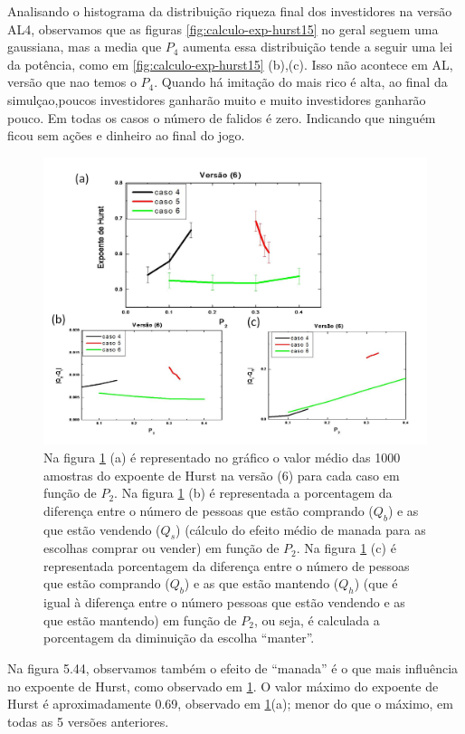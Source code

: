 \documentclass[brazil,ruledheader]{abnt}
\begin{document}
Analisando o histograma da distribuição riqueza final dos investidores na versão
AL4, observamos que as figuras \ref{fig:calculo-exp-hurst15} no geral 
seguem uma gaussiana, mas a media que $P_4$ aumenta essa distribuição tende a
seguir uma lei da potência, como em \ref{fig:calculo-exp-hurst15} (b),(c).
Isso não acontece em AL, versão que nao temos o $P_4$. Quando há imitação do
mais rico é alta, ao final da simulçao,poucos investidores ganharão muito e
muito investidores ganharão pouco. Em todas os casos o número de falidos é zero.
Indicando que ninguém ficou sem ações e dinheiro ao final do jogo.

\begin{figure}[!h]
\centering
\includegraphics[width=.7\linewidth]{Figuras/44.jpg}
\caption{Na figura \ref{fig:grafico6} (a) é representado no gráfico o valor
médio das 1000 amostras do expoente de Hurst na versão (6) para cada caso em
função de $P_2$. Na figura \ref{fig:grafico6} (b) é representada a porcentagem
 da diferença entre o número de pessoas que estão
comprando ($Q_b$) e as que estão vendendo ($Q_s$) (cálculo do efeito médio de
manada para as escolhas comprar ou vender) em função de $P_2$. Na figura
\ref{fig:grafico6} (c) é representada porcentagem  da
diferença entre o número de pessoas que estão comprando ($Q_b$) e as que estão
mantendo ($Q_h$) (que é igual à diferença entre o número pessoas que estão
vendendo e as que estão mantendo) em função de $P_2$, ou seja, é calculada a
porcentagem da diminuição da escolha ``manter''.}
\label{fig:grafico6}
\end{figure}

Na figura 5.44, observamos também o efeito de “manada” é o que mais influência
no expoente de Hurst, como observado em \ref{fig:grafico6}. O valor máximo do
expoente de Hurst é aproximadamente 0.69, observado em \ref{fig:grafico6}(a);
menor do que o máximo, em todas as 5 versões anteriores.  
\end{document}

